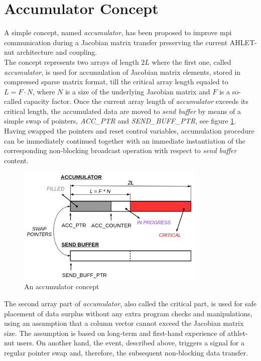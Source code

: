 \section{Accumulator Concept}
\label{sec:accumulator-approach}



A simple concept, named \textit{accumulator}, has been proposed to improve \gls{mpi} communication during a Jacobian matrix transfer preserving the current AHLET-\gls{nut} architecture and coupling.\\


The concept represents two arrays of length $2L$ where the first one, called \textit{accumulator}, is used for accumulation of Jacobian matrix elements, stored in compressed sparse matrix format, till the critical array length equaled to $L = F \cdot N$, where $N$ is a size of the underlying Jacobian matrix and $F$ is a so-called capacity factor. Once the current array length of \textit{accumulator} exceeds its critical length, the accumulated data are moved to \textit{send buffer} by means of a simple swap of pointers, \textit{ACC\_PTR} and \textit{SEND\_BUFF\_PTR}, see figure \ref{fig:accumulator-concept}. Having swapped the pointers and reset control variables, accumulation procedure can be immediately continued together with an immediate instantiation of the corresponding non-blocking broadcast operation with respect to \textit{send buffer} content.\\


\begin{figure}[htpb]
  \centering
  \includegraphics[width=0.8\textwidth]{figures/chapter-3/accumulator-concept.png}
  \caption{An accumulator concept} \label{fig:accumulator-concept}
\end{figure}


The second array part of \textit{accumulator}, also called the critical part, is used for safe placement of data surplus without any extra program checks and manipulations, using an assumption that a column vector cannot exceed the Jacobian matrix size. The assumption is based on long-term and first-hand experience of \gls{athlet}-\gls{nut} users. On another hand, the event, described above, triggers a signal for a regular pointer swap and, therefore, the subsequent non-blocking data transfer.\\


